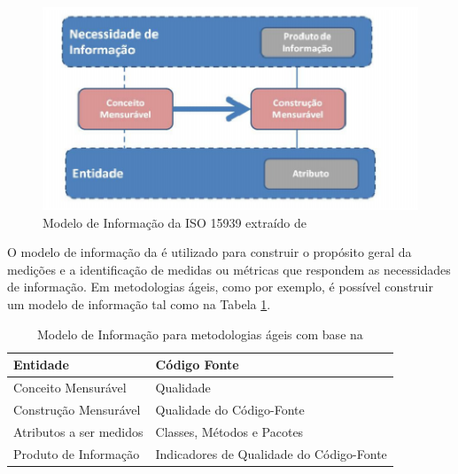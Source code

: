 \begin{figure}[h!]
\centering
	\includegraphics[keepaspectratio=true,scale=1]{figuras/mensuravel.eps}
	\caption{Modelo de Informação da ISO 15939 extraído de 
	}
	\label{informação}
\end{figure}
\FloatBarrier

O modelo de informação da  é utilizado para construir o 
propósito geral da medições e a identificação de medidas ou métricas que 
respondem as necessidades de informação. Em metodologias ágeis, como por exemplo, é possível construir um modelo de informação tal como na 
Tabela \ref{construção-ágil}.

	\begin{table}[!ht]
	\begin{center}
	 \begin{tabular}{|l|l|}
		\hline
		Entidade  & Código Fonte 
		\\ \hline
		Conceito Mensurável       & Qualidade      
		\\ \hline
		Construção Mensurável       & Qualidade do Código-Fonte      
		\\ \hline
		Atributos a ser medidos & Classes, Métodos e Pacotes   
		\\ \hline
		Produto de Informação   & Indicadores de Qualidade do Código-Fonte      
		\\ \hline
		\end{tabular}
		\caption{Modelo de Informação para metodologias ágeis com base na 
		}
		\label{construção-ágil}
		\end{center}
		\end{table}		


